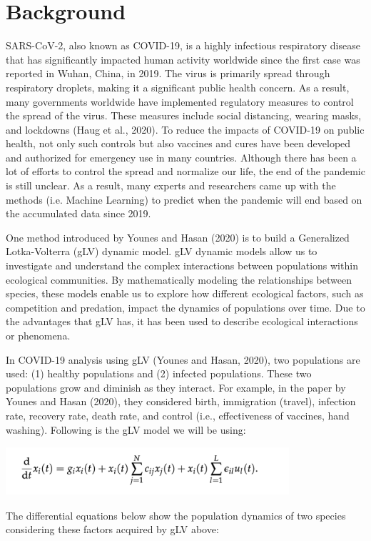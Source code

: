 \section{Background} \label{form}
\hspace{5mm}SARS-CoV-2, also known as COVID-19, is a highly infectious respiratory disease that has significantly impacted human activity worldwide since the first case was reported in Wuhan, China, in 2019. The virus is primarily spread through respiratory droplets, making it a significant public health concern. As a result, many governments worldwide have implemented regulatory measures to control the spread of the virus. These measures include social distancing, wearing masks, and lockdowns (Haug et al., 2020). To reduce the impacts of COVID-19 on public health, not only such controls but also vaccines and cures have been developed and authorized for emergency use in many countries. Although there has been a lot of efforts to control the spread and normalize our life, the end of the pandemic is still unclear. As a result, many experts and researchers came up with the methods (i.e. Machine Learning) to predict when the pandemic will end based on the accumulated data since 2019. 

One method introduced by Younes and Hasan (2020) is to build a Generalized Lotka-Volterra (gLV) dynamic model. gLV dynamic models allow us to investigate and understand the complex interactions between populations within ecological communities. By mathematically modeling the relationships between species, these models enable us to explore how different ecological factors, such as competition and predation, impact the dynamics of populations over time. Due to the advantages that gLV has, it has been used to describe ecological interactions or phenomena.

In COVID-19 analysis using gLV (Younes and Hasan, 2020), two populations are used: (1) healthy populations and (2) infected populations. These two populations grow and diminish as they interact. For example, in the paper by Younes and Hasan (2020), they considered birth, immigration (travel), infection rate, recovery rate, death rate, and control (i.e., effectiveness of vaccines, hand washing). Following is the gLV model we will be using:
\vspace{-3mm}
\begin{center}
    \includegraphics[width=10.5cm, 
height=1.8cm]{img/(1).png}
\end{center}
\vspace{-3mm}
The differential equations below show the population dynamics of two species considering these factors acquired by gLV above:


